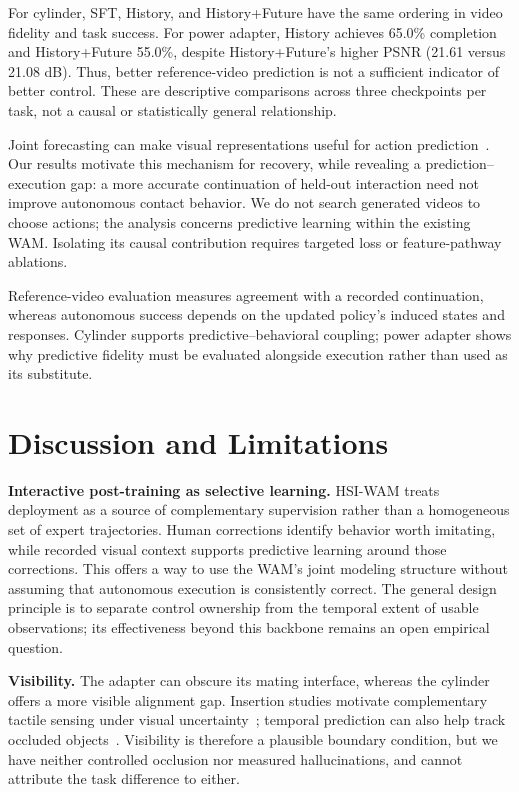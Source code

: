 \documentclass[letterpaper,10pt,conference]{ieeeconf}
\begin{document}
For cylinder, SFT, History, and History+Future have the same ordering in video fidelity and task success. For power adapter, History achieves 65.0\% completion and History+Future 55.0\%, despite History+Future's higher PSNR (21.61 versus 21.08 dB). Thus, better reference-video prediction is not a sufficient indicator of better control. These are descriptive comparisons across three checkpoints per task, not a causal or statistically general relationship.

Joint forecasting can make visual representations useful for action prediction~\cite{videovla}. Our results motivate this mechanism for recovery, while revealing a prediction--execution gap: a more accurate continuation of held-out interaction need not improve autonomous contact behavior. We do not search generated videos to choose actions; the analysis concerns predictive learning within the existing WAM. Isolating its causal contribution requires targeted loss or feature-pathway ablations.

Reference-video evaluation measures agreement with a recorded continuation, whereas autonomous success depends on the updated policy's induced states and responses. Cylinder supports predictive--behavioral coupling; power adapter shows why predictive fidelity must be evaluated alongside execution rather than used as its substitute.

\section{Discussion and Limitations}

\textbf{Interactive post-training as selective learning.} HSI-WAM treats deployment as a source of complementary supervision rather than a homogeneous set of expert trajectories. Human corrections identify behavior worth imitating, while recorded visual context supports predictive learning around those corrections. This offers a way to use the WAM's joint modeling structure without assuming that autonomous execution is consistently correct. The general design principle is to separate control ownership from the temporal extent of usable observations; its effectiveness beyond this backbone remains an open empirical question.

\textbf{Visibility.} The adapter can obscure its mating interface, whereas the cylinder offers a more visible alignment gap. Insertion studies motivate complementary tactile sensing under visual uncertainty~\cite{visiontouch}; temporal prediction can also help track occluded objects~\cite{temporalplanning}. Visibility is therefore a plausible boundary condition, but we have neither controlled occlusion nor measured hallucinations, and cannot attribute the task difference to either.
\end{document}
